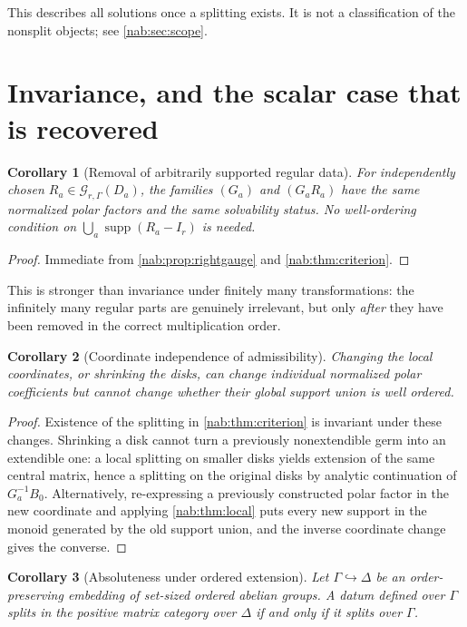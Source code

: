 \documentclass[11pt,letterpaper]{article}
\newtheorem{corollary}[corollary]{Corollary}
\theoremstyle{definition}
\theoremstyle{remark}
\newcommand{\GG}{\mathscr G_{r,\Gamma}}
\newcommand{\supp}{\operatorname{supp}}
\numberwithin{equation}{section}
\begin{document}
This describes all solutions once a splitting exists. It is not a
classification of the nonsplit objects; see \cref{nab:sec:scope}.

\section{Invariance, and the scalar case that is recovered}
\label{nab:sec:invariance}

\begin{corollary}[Removal of arbitrarily supported regular data]
\label{nab:cor:localgauges}
For independently chosen $R_a\in\GG(D_a)$, the families $(G_a)$ and
$(G_aR_a)$ have the same normalized polar factors and the same solvability
status. No well-ordering condition on $\bigcup_a\supp(R_a-I_r)$ is needed.
\end{corollary}

\begin{proof}
Immediate from \cref{nab:prop:rightgauge} and \cref{nab:thm:criterion}.
\end{proof}

This is stronger than invariance under finitely many transformations: the
infinitely many regular parts are genuinely irrelevant, but only \emph{after}
they have been removed in the correct multiplication order.

\begin{corollary}[Coordinate independence of admissibility]
\label{nab:cor:coordinates}
Changing the local coordinates, or shrinking the disks, can change individual
normalized polar coefficients but cannot change whether their global support
union is well ordered.
\end{corollary}

\begin{proof}
Existence of the splitting in \cref{nab:thm:criterion} is invariant under
these changes. Shrinking a disk cannot turn a previously nonextendible germ
into an extendible one: a local splitting on smaller disks yields extension of
the same central matrix, hence a splitting on the original disks by analytic
continuation of $G_a^{-1}B_0$. Alternatively, re-expressing a previously
constructed polar factor in the new coordinate and applying
\cref{nab:thm:local} puts every new support in the monoid generated by the old
support union, and the inverse coordinate change gives the converse.
\end{proof}

\begin{corollary}[Absoluteness under ordered extension]
\label{nab:cor:extension}
Let $\Gamma\hookrightarrow\Delta$ be an order-preserving embedding of
set-sized ordered abelian groups. A datum defined over $\Gamma$ splits in the
positive matrix category over $\Delta$ if and only if it splits over $\Gamma$.
\end{corollary}
\end{document}

